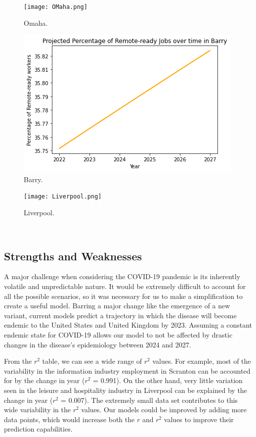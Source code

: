 \documentclass{article}
\begin{document}
\begin{figure}
  \centering
  \texttt{[image: OMaha.png]}
  \caption{Omaha.}
  \label{fig:OmahaQ1}
\end{figure}
\newpage
\begin{figure}
  \centering
  \includegraphics[width=.55\linewidth]{Barry.png}
  \caption{Barry.}
  \label{fig:BarryQ1}
\end{figure}

\begin{figure}
  \centering
  \texttt{[image: Liverpool.png]}
  \caption{Liverpool.}
  \label{fig:LiverpoolQ1}
\end{figure}

\newpage
\
\subsection{Strengths and Weaknesses}

\indent
A major challenge when considering the COVID-19 pandemic is its inherently volatile and unpredictable nature. It would be extremely difficult to account for all the possible scenarios, so it was necessary for us to make a simplification to create a useful model. Barring a major change like the emergence of a new variant, current models predict a trajectory in which the disease will become endemic to the United States and United Kingdom by 2023. Assuming a constant endemic state for COVID-19 allows our model to not be affected by drastic changes in the disease’s epidemiology between 2024 and 2027.

From the $r^2$ table, we can see a wide range of $r^2$ values. For example, most of the variability in the information industry employment in Scranton can be accounted for by the change in year ($r^2$ = 0.991). On the other hand, very little variation seen in the leisure and hospitality industry in Liverpool can be explained by the change in year ($r^2$ = 0.007). The extremely small data set contributes to this wide variability in the $r^2$ values. Our models could be improved by adding more data points, which would increase both the $r$ and $r^2$ values to improve their prediction capabilities.
\end{document}
